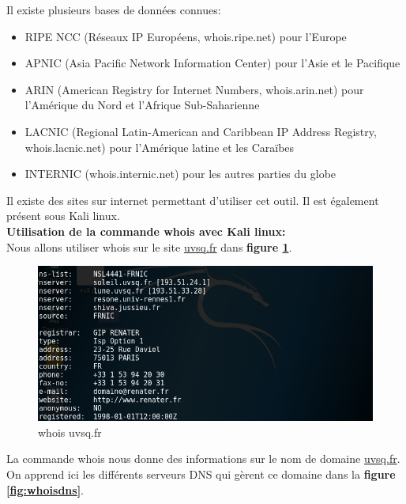 \noindent Il existe plusieurs bases de données connues:

\begin{itemize}
    \item RIPE NCC (Réseaux IP Européens, whois.ripe.net) pour l'Europe
    \item APNIC (Asia Pacific Network Information Center) pour l'Asie et le Pacifique
    \item ARIN (American Registry for Internet Numbers, whois.arin.net) pour l'Amérique du Nord et l'Afrique Sub-Saharienne
    \item LACNIC (Regional Latin-American and Caribbean IP Address Registry, whois.lacnic.net) pour l'Amérique latine et les Caraïbes
    \item  INTERNIC (whois.internic.net) pour les autres parties du globe
\end{itemize}

\noindent Il existe des sites sur internet permettant d'utiliser cet outil. Il est également présent sous Kali linux.\\

\noindent \textbf{Utilisation de la commande whois avec Kali linux:}\\
Nous allons utiliser whois sur le site \url{uvsq.fr} dans \textbf{figure \ref{fig:whois}}.\\

\begin{figure}[htp!]
  \centering
  \setlength\figureheight{7cm}
  \setlength\figurewidth{9cm}
  \includegraphics[width=1\textwidth]{oui/images/Whois/whois2.PNG}
  \caption{whois uvsq.fr}
  \label{fig:whois}
\end{figure}

\noindent La commande whois nous donne des informations sur le nom de domaine \url{uvsq.fr}. On apprend ici les différents serveurs DNS qui gèrent ce domaine dans la  \textbf{figure \ref{fig:whoisdns}}.

